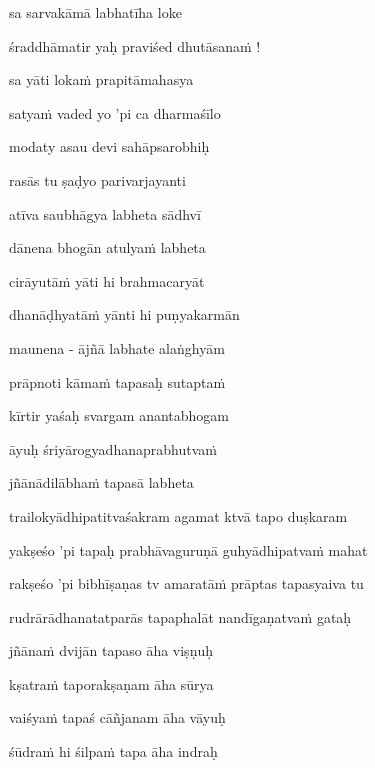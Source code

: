 \nemslokad 
sa sarvakāmā labhatīha loke \veg\dontdisplaylinenum

\ujvers\nemsloka 
śraddhāmatir yaḥ praviśed dhutāsanaṁ !
\dontdisplaylinenum

\nemslokab 
sa yāti lokaṁ prapitāmahasya \danda\dontdisplaylinenum

\nemslokac 
satyaṁ vaded yo 'pi ca dharmaśīlo
\dontdisplaylinenum

\nemslokad 
modaty asau devi sahāpsarobhiḥ \veg\dontdisplaylinenum

\ujvers\nemsloka 
rasās tu ṣaḍyo parivarjayanti
\dontdisplaylinenum

\nemslokab 
atīva saubhāgya labheta sādhvī \danda\dontdisplaylinenum

\nemslokac 
dānena bhogān atulyaṁ labheta
\dontdisplaylinenum

\nemslokad 
cirāyutāṁ yāti hi brahmacaryāt \veg\dontdisplaylinenum

\ujvers\nemsloka 
dhanāḍhyatāṁ yānti hi puṇyakarmān
\dontdisplaylinenum

\nemslokab 
maunena - ājñā labhate alaṅghyām \danda\dontdisplaylinenum

\nemslokac 
prāpnoti kāmaṁ tapasaḥ sutaptaṁ
\dontdisplaylinenum

\nemslokad 
kīrtir yaśaḥ svargam anantabhogam \veg\dontdisplaylinenum

\vers

āyuḥ śriyārogyadhanaprabhutvaṁ\thinspace{\dandab} \dontdisplaylinenum

jñānādilābhaṁ tapasā labheta \veg\dontdisplaylinenum

\ujvers\nemsloka 
trailokyādhipatitvaśakram agamat ktvā tapo duṣkaram
\dontdisplaylinenum

\nemslokab 
yakṣeśo 'pi tapaḥ prabhāvaguruṇā guhyādhipatvaṁ mahat \danda\dontdisplaylinenum

\nemslokac 
rakṣeśo 'pi bibhīṣaṇas tv amaratāṁ prāptas tapasyaiva tu
\dontdisplaylinenum

\nemslokad 
rudrārādhanatatparās tapaphalāt nandīgaṇatvaṁ gataḥ \veg\dontdisplaylinenum

\ujvers\nemsloka 
jñānaṁ dvijān tapaso āha viṣṇuḥ
\dontdisplaylinenum

\nemslokab 
kṣatraṁ taporakṣaṇam āha sūrya \danda\dontdisplaylinenum

\nemslokac 
vaiśyaṁ tapaś cāñjanam āha vāyuḥ
\dontdisplaylinenum

\nemslokad 
śūdraṁ hi śilpaṁ tapa āha indraḥ \veg\dontdisplaylinenum

